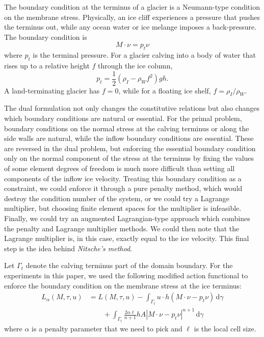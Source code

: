 \documentclass{article}
\theoremstyle{definition}
\theoremstyle{plain}
\newcommand{\ud}{\hspace{2pt}\mathrm{d}}
\begin{document}
The boundary condition at the terminus of a glacier is a Neumann-type condition on the membrane stress.
Physically, an ice cliff experiences a pressure that pushes the terminus out, while any ocean water or ice melange imposes a back-pressure.
The boundary condition is
\begin{equation}
    M\cdot\nu = p_t\nu
\end{equation}
where $p_t$ is the terminal pressure.
For a glacier calving into a body of water that rises up to a relative height $f$ through the ice column,
\begin{equation}
    p_t = \frac{1}{2}\left(\rho_I - \rho_Wf^2\right)gh.
\end{equation}
A land-terminating glacier has $f = 0$, while for a floating ice shelf, $f = \rho_I / \rho_W$.

The dual formulation not only changes the constitutive relations but also changes which boundary conditions are natural or essential.
For the primal problem, boundary conditions on the normal stress at the calving terminus or along the side walls are natural, while the inflow boundary conditions are essential.
These are reversed in the dual problem, but enforcing the essential boundary condition only on the normal component of the stress at the terminus by fixing the values of some element degrees of freedom is much more difficult than setting all components of the inflow ice velocity.
Treating this boundary condition as a constraint, we could enforce it through a pure penalty method, which would destroy the condition number of the system, or we could try a Lagrange multiplier, but choosing finite element spaces for the multiplier is infeasible.
Finally, we could try an augmented Lagrangian-type approach which combines the penalty and Lagrange multiplier methods.
We could then note that the Lagrange multiplier is, in this case, exactly equal to the ice velocity.
This final step is the idea behind \emph{Nitsche's method}.

Let $\Gamma_t$ denote the calving terminus part of the domain boundary.
For the experiments in this paper, we used the following modified action functional to enforce the boundary condition on the membrane stress at the ice terminus:
\begin{align}
    L_\alpha(M, \tau, u) & = L(M, \tau, u) - \int_{\Gamma_t}u\cdot h\left(M\cdot\nu - p_t\nu\right)\ud\gamma \nonumber\\
    & \qquad + \int_{\Gamma_t}\frac{2\alpha\ell}{n + 1}hA\left|M\cdot\nu - p_t\nu\right|^{n + 1}\ud\gamma
    \label{eq:nitsche-functional}
\end{align}
where $\alpha$ is a penalty parameter that we need to pick and $\ell$ is the local cell size.
\end{document}
